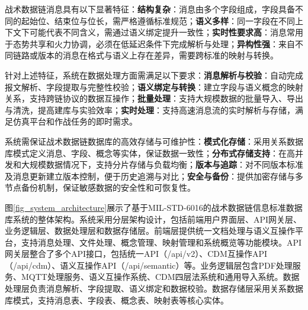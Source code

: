 \begin{table}[!htb]
    \caption{战术数据链数据特征与处理需求概览}
    \label{table_data_features}
    \centering
\end{table}

战术数据链消息具有以下显著特征\cite{jiang2019_sensors}：\textbf{结构复杂}：消息由多个字段组成，字段具备不同的起始位、结束位与位长，需严格遵循标准规范；\textbf{语义多样}：同一字段在不同上下文下可能代表不同含义，需通过语义绑定提升一致性；\textbf{实时性要求高}：消息常用于态势共享和火力协调，必须在低延迟条件下完成解析与处理；\textbf{异构性强}：来自不同链路或版本的消息在格式与语义上存在差异，需要跨标准的映射与转换。

针对上述特征，系统在数据处理方面需满足以下要求\cite{hegarty_1997_nav_interference}：\textbf{消息解析与校验}：自动完成报文解析、字段提取与完整性校验；\textbf{语义绑定与转换}：建立字段与语义概念的映射关系，支持跨链协议的数据互操作；\textbf{批量处理}：支持大规模数据的批量导入、导出与清洗，提高建库与实验效率；\textbf{实时处理}：支持高速消息流的实时解析与存储，满足仿真平台和作战任务的即时需求。

系统需保证战术数据链数据库的高效存储与可维护性\cite{schnaufer_mcgraw_1997_waas}：\textbf{模式化存储}：采用关系数据库模式定义消息、字段、概念等实体，保证数据一致性；\textbf{分布式存储支持}：在高并发和大规模数据情况下，支持分片存储与负载均衡；\textbf{版本与追踪}：对不同版本标准及消息更新建立版本控制，便于历史追溯与对比；\textbf{安全与备份}：提供加密存储与多节点备份机制，保证敏感数据的安全性和可恢复性。

图\ref{fig_system_architecture}展示了基于MIL-STD-6016的战术数据链信息标准数据库系统的整体架构。系统采用分层架构设计，包括前端用户界面层、API网关层、业务逻辑层、数据处理层和数据存储层。前端层提供统一文档处理与语义互操作平台，支持消息处理、文件处理、概念管理、映射管理和系统概览等功能模块。API网关层整合了多个API接口，包括统一API（/api/v2）、CDM互操作API（/api/cdm）、语义互操作API（/api/semantic）等。业务逻辑层包含PDF处理服务、MQTT处理服务、语义互操作系统、CDM四层法系统和通用导入系统。数据处理层负责消息解析、字段提取、语义绑定和数据校验。数据存储层采用关系数据库模式，支持消息表、字段表、概念表、映射表等核心实体。

